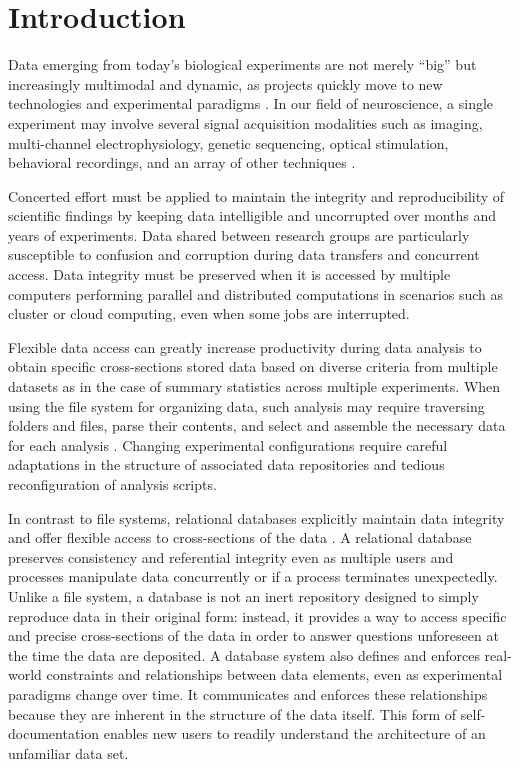 \section*{Introduction}
Data emerging from today's biological experiments are not merely ``big'' but increasingly multimodal and dynamic, as projects quickly move to new technologies and experimental paradigms \cite{howe_big_2008, maze_analytical_2014, editorial_focus_2014, anderson_issues_2007, kandel_neuroscience_2013, gray_scientific_2005}.
In our field of neuroscience, a single experiment may involve several signal acquisition modalities such as imaging, multi-channel electrophysiology, genetic sequencing, optical stimulation, behavioral recordings, and an array of other techniques \cite{reimer_pupil_2014,froudarakis_population_2014}.

Concerted effort must be applied to maintain the integrity and reproducibility of scientific findings by keeping data intelligible and uncorrupted over months and years of experiments.
Data shared between research groups are particularly susceptible to confusion and corruption during data transfers and concurrent access. 
Data integrity must be preserved when it is accessed by multiple computers performing parallel and distributed computations in scenarios such as cluster or cloud computing, even when some jobs are interrupted.

Flexible data access can greatly increase productivity during data analysis to obtain specific cross-sections stored data based on diverse criteria from multiple datasets as in the case of summary statistics across multiple experiments.
When using the file system for organizing data, such analysis may require traversing folders and files, parse their contents, and select and assemble the necessary data for each analysis \cite{anderson_issues_2007}.
Changing experimental configurations require careful adaptations in the structure of associated data repositories and tedious reconfiguration of analysis scripts.

In contrast to file systems, relational databases explicitly maintain data integrity and offer flexible access to cross-sections of the data \cite{codd_relational_1970}. 
A relational database preserves consistency and referential integrity even as multiple users and processes manipulate data concurrently or if a process terminates unexpectedly.
Unlike a file system, a database is not an inert repository designed to simply reproduce data in their original form: instead, it provides a way to access specific and precise cross-sections of the data in order to answer questions unforeseen at the time the data are deposited.
A database system also defines and enforces real-world constraints and relationships between data elements, even as experimental paradigms change over time.
It communicates and enforces these relationships because they are inherent in the structure of the data itself.
This form of self-documentation enables new users to readily understand the architecture of an unfamiliar data set.

